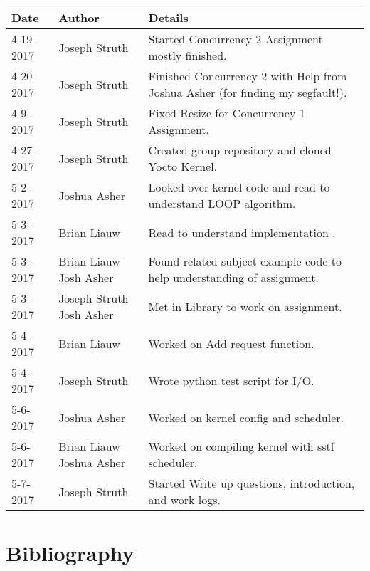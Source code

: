 \documentclass[10pt,draftclsnofoot,onecolumn, compsoc]{IEEEtran}
\begin{document}
\begin{tabular}{| l | l | p{15cm} |}\textbf{Date} & \textbf{Author} & \textbf{Details}\\\hline
4-19-2017 & Joseph Struth & Started Concurrency 2 Assignment mostly finished.\\\hline
4-20-2017 & Joseph Struth & Finished Concurrency 2 with Help from Joshua Asher (for finding my segfault!).\\\hline
4-9-2017 & Joseph Struth & Fixed Resize for Concurrency 1 Assignment.\\\hline
4-27-2017 & Joseph Struth & Created group repository and cloned Yocto Kernel.\\\hline
5-2-2017 & Joshua Asher & Looked over kernel code and read to understand LOOP algorithm.\\\hline
5-3-2017 & Brian Liauw & Read to understand implementation .\\\hline
5-3-2017 & Brian Liauw Josh Asher & Found related subject example code to help understanding of assignment.\\\hline
5-3-2017 & Joseph Struth Josh Asher & Met in Library to work on assignment.\\\hline
5-4-2017 & Brian Liauw & Worked on Add request function.\\\hline
5-4-2017 & Joseph Struth & Wrote python test script for I/O.\\\hline
5-6-2017 & Joshua Asher & Worked on kernel config and scheduler.\\\hline
5-6-2017 & Brian Liauw Joshua Asher & Worked on compiling kernel with sstf scheduler.\\\hline
5-7-2017 & Joseph Struth & Started Write up questions, introduction, and work logs.\\\hline

\end{tabular}

\section{Bibliography}
\nocite{*}


\end{document}

